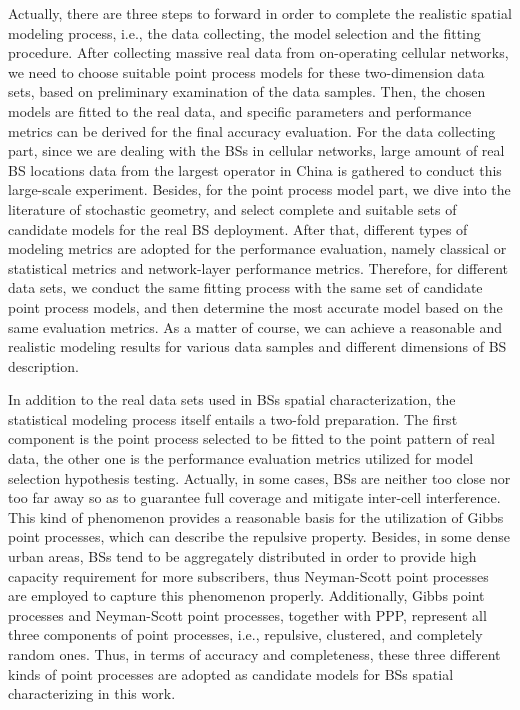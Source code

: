 Actually, there are three steps to forward in order to complete the realistic spatial modeling process, i.e., the data collecting, the model selection and the fitting procedure. After collecting massive real data from on-operating cellular networks, we need to choose suitable point process models for these two-dimension data sets, based on preliminary examination of the data samples. Then, the chosen models are fitted to the real data, and specific parameters and performance metrics can be derived for the final accuracy evaluation. For the data collecting part, since we are dealing with the BSs in cellular networks, large amount of real BS locations data from the largest operator in China is gathered to conduct this large-scale experiment. Besides, for the point process model part, we dive into the literature of stochastic geometry, and select complete and suitable sets of candidate models for the real BS deployment. After that, different types of modeling metrics are adopted for the performance evaluation, namely  classical or statistical metrics and network-layer performance metrics. Therefore, for different data sets, we conduct the same fitting process with the same set of candidate point process models, and then determine the most accurate model based on the same evaluation metrics. As a matter of course, we can achieve a reasonable and realistic modeling results for various data samples and different dimensions of BS description.

In addition to the real data sets used in BSs spatial characterization, the statistical modeling process itself entails a two-fold preparation. The first component is the point process selected to be fitted to the point pattern of real data, the other one is the performance evaluation metrics utilized for model selection hypothesis testing. Actually, in some cases, BSs are neither too close nor too far away so as to guarantee full coverage and mitigate inter-cell interference. This kind of phenomenon provides a reasonable basis for the utilization of Gibbs point processes, which can describe the repulsive property. Besides, in some dense urban areas, BSs tend to be aggregately distributed in order to provide high capacity requirement for more subscribers, thus Neyman-Scott point processes are employed to capture this phenomenon properly. Additionally, Gibbs point processes and Neyman-Scott point processes, together with PPP, represent all three components of point processes, i.e., repulsive, clustered, and completely random ones. Thus, in terms of accuracy and completeness, these three different kinds of point processes \cite{chiu2013stochastic} are adopted as candidate models for BSs spatial characterizing in this work.

